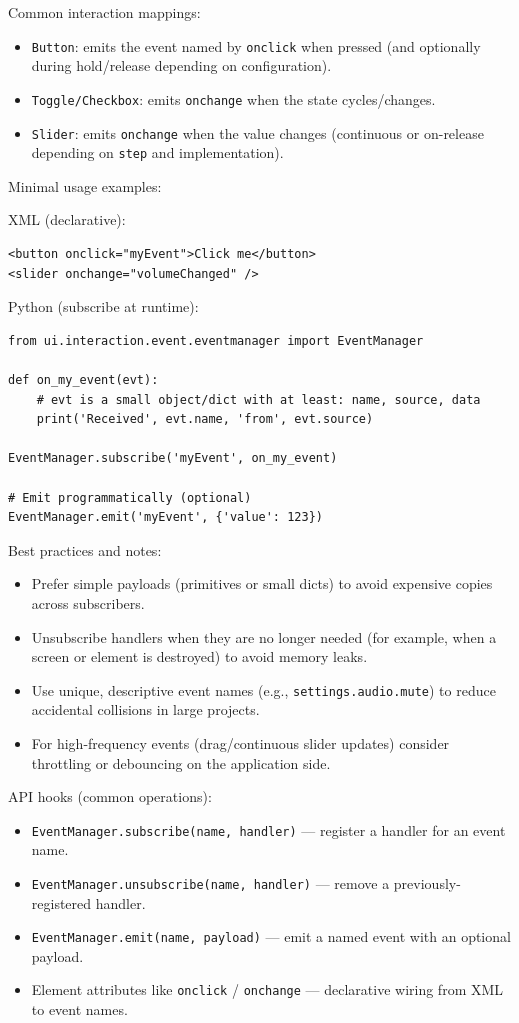 \documentclass[a4paper,11pt]{article}
\begin{document}
Common interaction mappings:
\begin{itemize}
    \item \texttt{Button}: emits the event named by \texttt{onclick} when pressed (and optionally during hold/release depending on configuration).
    \item \texttt{Toggle/Checkbox}: emits \texttt{onchange} when the state cycles/changes.
    \item \texttt{Slider}: emits \texttt{onchange} when the value changes (continuous or on-release depending on \texttt{step} and implementation).
\end{itemize}

Minimal usage examples:

XML (declarative):
\begin{verbatim}
<button onclick="myEvent">Click me</button>
<slider onchange="volumeChanged" />
\end{verbatim}

Python (subscribe at runtime):
\begin{verbatim}
from ui.interaction.event.eventmanager import EventManager

def on_my_event(evt):
    # evt is a small object/dict with at least: name, source, data
    print('Received', evt.name, 'from', evt.source)

EventManager.subscribe('myEvent', on_my_event)

# Emit programmatically (optional)
EventManager.emit('myEvent', {'value': 123})
\end{verbatim}

Best practices and notes:
\begin{itemize}
    \item Prefer simple payloads (primitives or small dicts) to avoid expensive copies across subscribers.
    \item Unsubscribe handlers when they are no longer needed (for example, when a screen or element is destroyed) to avoid memory leaks.
    \item Use unique, descriptive event names (e.g., \texttt{settings.audio.mute}) to reduce accidental collisions in large projects.
    \item For high-frequency events (drag/continuous slider updates) consider throttling or debouncing on the application side.
\end{itemize}

API hooks (common operations):
\begin{itemize}
    \item \texttt{EventManager.subscribe(name, handler)} — register a handler for an event name.
    \item \texttt{EventManager.unsubscribe(name, handler)} — remove a previously-registered handler.
    \item \texttt{EventManager.emit(name, payload)} — emit a named event with an optional payload.
    \item Element attributes like \texttt{onclick} / \texttt{onchange} — declarative wiring from XML to event names.
\end{itemize}
\end{document}
